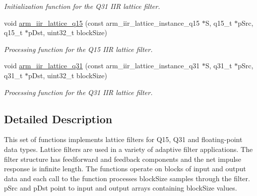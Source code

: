 \begin{DoxyCompactItemize}
\begin{DoxyCompactList}\small\item\em Initialization function for the Q31 I\+IR lattice filter. \end{DoxyCompactList}\item 
void \hyperlink{group__IIR__Lattice_gaeb9e9599a288832ed123183eaa8b294a}{arm\+\_\+iir\+\_\+lattice\+\_\+q15} (const arm\+\_\+iir\+\_\+lattice\+\_\+instance\+\_\+q15 $\ast$S, q15\+\_\+t $\ast$p\+Src, q15\+\_\+t $\ast$p\+Dst, uint32\+\_\+t block\+Size)
\begin{DoxyCompactList}\small\item\em Processing function for the Q15 I\+IR lattice filter. \end{DoxyCompactList}\item 
void \hyperlink{group__IIR__Lattice_ga123b26fa9156cd8d3622dd85931741ed}{arm\+\_\+iir\+\_\+lattice\+\_\+q31} (const arm\+\_\+iir\+\_\+lattice\+\_\+instance\+\_\+q31 $\ast$S, q31\+\_\+t $\ast$p\+Src, q31\+\_\+t $\ast$p\+Dst, uint32\+\_\+t block\+Size)
\begin{DoxyCompactList}\small\item\em Processing function for the Q31 I\+IR lattice filter. \end{DoxyCompactList}\end{DoxyCompactItemize}


\subsection{Detailed Description}
This set of functions implements lattice filters for Q15, Q31 and floating-\/point data types. Lattice filters are used in a variety of adaptive filter applications. The filter structure has feedforward and feedback components and the net impulse response is infinite length. The functions operate on blocks of input and output data and each call to the function processes {\ttfamily block\+Size} samples through the filter. {\ttfamily p\+Src} and {\ttfamily p\+Dst} point to input and output arrays containing {\ttfamily block\+Size} values.

